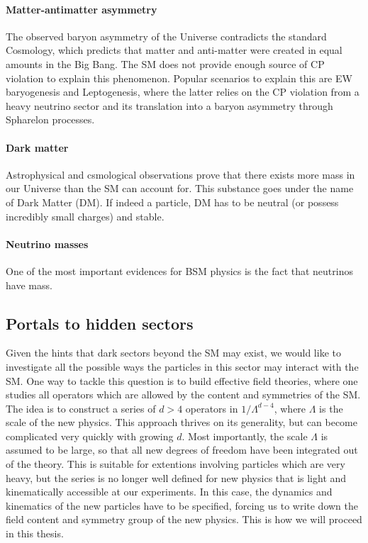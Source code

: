 \paragraph{Matter-antimatter asymmetry} The observed baryon asymmetry of the Universe contradicts the standard Cosmology, which predicts that matter and anti-matter were created in equal amounts in the Big Bang. The SM does not provide enough source of CP violation to explain this phenomenon. Popular scenarios to explain this are EW baryogenesis and Leptogenesis, where the latter relies on the CP violation from a heavy neutrino sector and its translation into a baryon asymmetry through Spharelon processes.

\paragraph{Dark matter} Astrophysical and csmological observations prove that there exists more mass in our Universe than the SM can account for. This substance goes under the name of Dark Matter (DM). If indeed a particle, DM has to be neutral (or possess incredibly small charges) and stable.  

\paragraph{Neutrino masses} One of the most important evidences for BSM physics is the fact that neutrinos have mass. 

\subsection{Portals to hidden sectors}

Given the hints that dark sectors beyond the SM may exist, we would like to investigate all the possible ways the particles in this sector may interact with the SM. One way to tackle this question is to build effective field theories, where one studies all operators which are allowed by the content and symmetries of the SM. The idea is to construct a series of $d>4$ operators in $1/\Lambda^{d-4}$, where $\Lambda$ is the scale of the new physics. This approach thrives on its generality, but can become complicated very quickly with growing $d$. Most importantly, the scale $\Lambda$ is assumed to be large, so that all new degrees of freedom have been integrated out of the theory. This is suitable for extentions involving particles which are very heavy, but the series is no longer well defined for new physics that is light and kinematically accessible at our experiments. In this case, the dynamics and kinematics of the new particles have to be specified, forcing us to write down the field content and symmetry group of the new physics. This is how we will proceed in this thesis.

